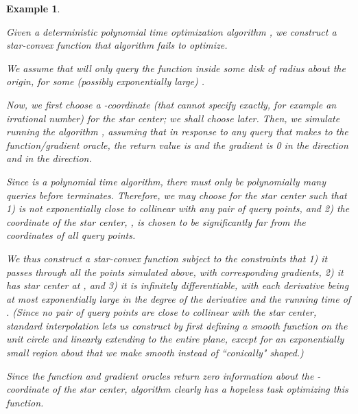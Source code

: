 \documentclass[11pt,letter]{article}
\newcounter{nTheorems}
\numberwithin{nTheorems}{section}
\newtheorem{example}[nTheorems]{Example}
\begin{document}
\begin{example}\label{ex:deterministic}

Given a deterministic polynomial time optimization algorithm , we construct a star-convex function  that algorithm  fails to optimize.

We assume that  will only query the function inside some disk of radius  about the origin, for some (possibly exponentially large) .

Now, we first choose a -coordinate  (that  cannot specify exactly, for example an irrational number) for the star center; we shall choose  later.
Then, we simulate running the algorithm , assuming that in response to any query  that  makes to the function/gradient oracle, the return value is  and the gradient  is 0 in the  direction and  in the  direction.

Since  is a polynomial time algorithm, there must only be polynomially many queries before  terminates.
Therefore, we may choose  for the star center such that 1)  is not exponentially close to collinear with any pair of query points, and 2) the  coordinate of the star center, , is chosen to be significantly far from the  coordinates of all query points.

We thus construct a star-convex function  subject to the constraints that 1) it passes through all the points simulated above, with corresponding gradients, 2) it has star center at , and 3) it is infinitely differentiable, with each derivative being at most exponentially large in the degree of the derivative and the running time of . (Since no pair of query points are close to collinear with the star center, standard interpolation lets us construct  by first defining a smooth function  on the unit circle and linearly extending  to the entire plane, except for an exponentially small region about  that we make smooth instead of ``conically" shaped.)

Since the function and gradient oracles return zero information about the -coordinate of the star center, algorithm  clearly has a hopeless task optimizing this function.


\end{example}
\end{document}
